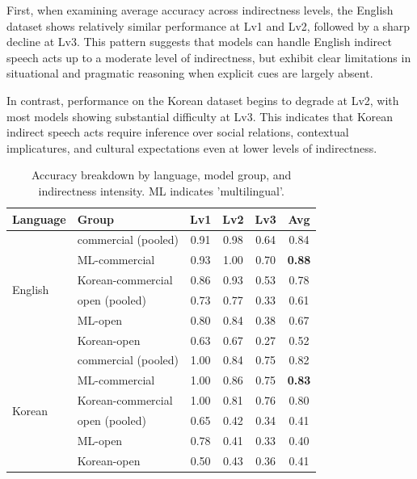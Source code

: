 \documentclass[11pt]{article}
\begin{document}
First, when examining average accuracy across indirectness levels, the English dataset shows relatively similar performance at Lv1 and Lv2, followed by a sharp decline at Lv3. This pattern suggests that models can handle English indirect speech acts up to a moderate level of indirectness, but exhibit clear limitations in situational and pragmatic reasoning when explicit cues are largely absent.

In contrast, performance on the Korean dataset begins to degrade at Lv2, with most models showing substantial difficulty at Lv3. This indicates that Korean indirect speech acts require inference over social relations, contextual implicatures, and cultural expectations even at lower levels of indirectness.

\begin{table}[t]
\centering
\footnotesize
\setlength{\tabcolsep}{4pt}
\renewcommand{\arraystretch}{0.9}
\begin{tabular}{llcccc}
\toprule
\textbf{Language} & \textbf{Group} & \textbf{Lv1} & \textbf{Lv2} & \textbf{Lv3} & \textbf{Avg} \\
\midrule
\multirow{6}{*}{English}
& commercial (pooled)        & 0.91 & 0.98 & 0.64 & 0.84 \\
& ML-commercial         & 0.93 & 1.00 & 0.70 & \textbf{0.88} \\
& Korean-commercial          & 0.86 & 0.93 & 0.53 & 0.78 \\
& open (pooled)              & 0.73 & 0.77 & 0.33 & 0.61 \\
& ML-open               & 0.80 & 0.84 & 0.38 & 0.67 \\
& Korean-open                & 0.63 & 0.67 & 0.27 & 0.52 \\
\midrule
\multirow{6}{*}{Korean}
& commercial (pooled)        & 1.00 & 0.84 & 0.75 & 0.82 \\
& ML-commercial         & 1.00 & 0.86 & 0.75 & \textbf{0.83} \\
& Korean-commercial          & 1.00 & 0.81 & 0.76 & 0.80 \\
& open (pooled)              & 0.65 & 0.42 & 0.34 & 0.41 \\
& ML-open               & 0.78 & 0.41 & 0.33 & 0.40 \\
& Korean-open                & 0.50 & 0.43 & 0.36 & 0.41 \\
\bottomrule
\end{tabular}
\caption{Accuracy breakdown by language, model group, and indirectness intensity. ML indicates 'multilingual'.}
\label{tab:intensity_group_analysis}
\end{table}
\end{document}
